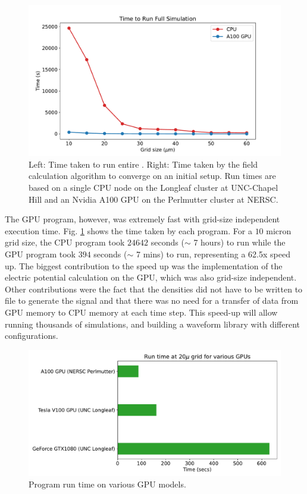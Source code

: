 \begin{figure}[!ht]
\centering
 \includegraphics[width=0.99\linewidth]{ch4/figs/cpu_gpu_comp.pdf}
\caption{\label{fig:GPU_time} Left: Time taken to run entire {\tdsim}. Right: Time taken by the field calculation algorithm to converge on an initial setup. Run times are based on a single CPU node on the Longleaf cluster at UNC-Chapel Hill and an Nvidia A100 GPU on the Perlmutter cluster at NERSC.}
\end{figure}


The GPU program, however, was extremely fast with grid-size independent execution time. Fig. \ref{fig:GPU_time} shows the time taken by each program. For a $10$ micron grid size, the CPU program took $24642$ seconds ($\sim$ 7 hours) to run while the GPU program took $394$ seconds ($\sim$ 7 mins) to run, representing a 62.5x speed up. The biggest contribution to the speed up was the implementation of the electric potential calculation on the GPU, which was also grid-size independent. Other contributions were the fact that the densities did not have to be written to file to generate the signal and that there was no need for a transfer of data from GPU memory to CPU memory at each time step. This speed-up will allow running thousands of simulations, and building a waveform library with different configurations.


 \begin{figure}[!htb]
    \centering
    \includegraphics[width=0.99\linewidth]{ch4/figs/gpu_comp.pdf}
\caption{\label{ch4:fig:GPU_comp} Program run time on various GPU models.}
\end{figure}


